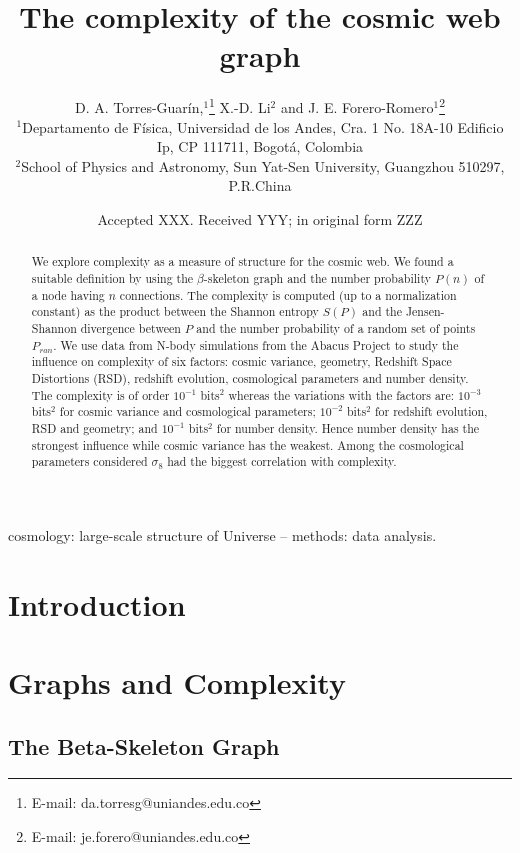 \documentclass[fleqn,usenatbib]{mnras}
\title[Cosmic Web Graph Complexity]{The complexity of the cosmic web graph}
\author[Torres-Guar\'in et al.]{
D. A. Torres-Guar\'in,$^{1}$\thanks{E-mail: da.torresg@uniandes.edu.co}
X.-D. Li$^{2}$
and J. E. Forero-Romero$^{1}$\thanks{E-mail: je.forero@uniandes.edu.co}
\\
$^{1}$Departamento de F\'isica, Universidad de los Andes, Cra. 1 No. 18A-10 Edificio Ip, CP 111711, Bogot\'a, Colombia\\
$^{2}$School of Physics and Astronomy, Sun Yat-Sen University, Guangzhou 510297, P.R.China\\
}
\date{Accepted XXX. Received YYY; in original form ZZZ}
\begin{document}
\label{firstpage}
\pagerange{\pageref{firstpage}--\pageref{lastpage}}
\maketitle

\begin{abstract}
We explore complexity as a measure of structure for the cosmic web. We
found a suitable definition by using the $\beta$-skeleton graph and
the number probability $P(n)$ of a node having $n$ connections. The
complexity is computed (up to a normalization constant) as the product
between the Shannon entropy $S(P)$ and the Jensen-Shannon divergence
between $P$ and the number probability of a random set of points
$P_{ran}$. We use data from N-body simulations from the Abacus Project
to study the influence on complexity of six factors: cosmic variance,
geometry, Redshift Space Distortions (RSD), redshift evolution,
cosmological parameters and number density. The complexity is of order
$10^{-1}$ bits$^2$ whereas the variations with the factors are:
$10^{-3}$ bits$^2$ for cosmic variance and cosmological parameters;
$10^{-2}$ bits$^2$ for redshift evolution, RSD and geometry; and
$10^{-1}$ bits$^2$ for number density. Hence number density has the
strongest influence while cosmic variance has the weakest. Among the
cosmological parameters considered $\sigma_{8}$ had the biggest
correlation with complexity.  
   \end{abstract}
\begin{keywords}
cosmology: large-scale structure of Universe -- methods: data analysis.
\end{keywords}


\section{Introduction}

\section{Graphs and Complexity}

\subsection{The Beta-Skeleton Graph}
\end{document}
